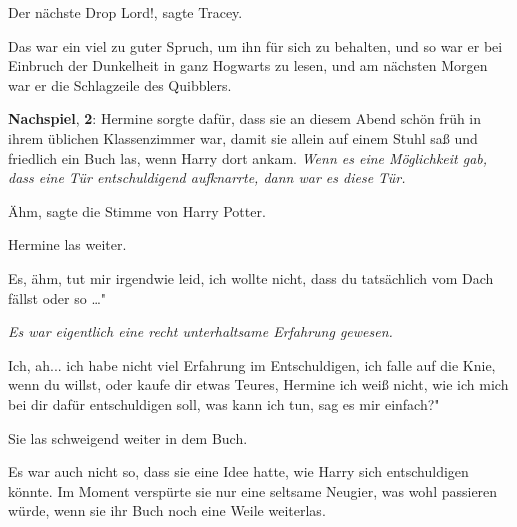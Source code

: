 \glqq{}Der nächste Drop Lord!\grqq{}, sagte Tracey.

Das war ein viel zu guter Spruch, um ihn für sich zu behalten, und so war er bei
Einbruch der Dunkelheit in ganz Hogwarts zu lesen, und am nächsten Morgen war er
die Schlagzeile des Quibblers.

\textbf{Nachspiel}, \textbf{2}: Hermine sorgte dafür, dass sie an diesem Abend
schön früh in ihrem üblichen Klassenzimmer war, damit sie allein auf einem Stuhl
saß und friedlich ein Buch las, wenn Harry dort ankam.
\emph{Wenn es eine Möglichkeit gab, dass eine Tür entschuldigend aufknarrte,
dann war es diese Tür.}

\glqq{}Ähm\grqq{}, sagte die Stimme von Harry Potter.

Hermine las weiter.

\glqq{}Es, ähm, tut mir irgendwie leid, ich wollte nicht, dass du tatsächlich vom
Dach fällst oder so …"

\emph{Es war eigentlich eine recht unterhaltsame Erfahrung gewesen.}

\glqq{}Ich, ah... ich habe nicht viel Erfahrung im Entschuldigen, ich falle auf
die Knie, wenn du willst, oder kaufe dir etwas Teures, Hermine ich weiß nicht,
wie ich mich bei dir dafür entschuldigen soll, was kann ich tun, sag es mir
einfach?"

Sie las schweigend weiter in dem Buch.

Es war auch nicht so, dass sie eine Idee hatte, wie Harry sich entschuldigen
könnte. Im Moment verspürte sie nur eine seltsame Neugier, was wohl passieren
würde, wenn sie ihr Buch noch eine Weile weiterlas.

